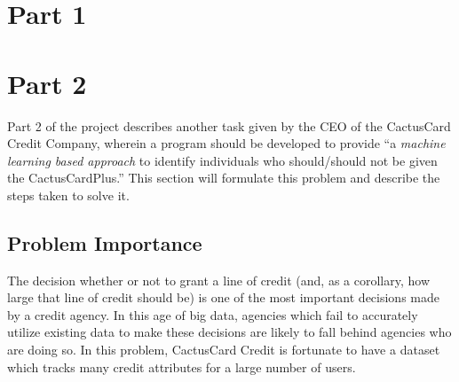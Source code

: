 \documentclass[11pt,journal]{IEEEtran}
\begin{document}
\IEEEpeerreviewmaketitle

\section{Part 1} \label{part1}
\section{Part 2} \label{part2}
Part 2 of the project describes another task given by the CEO of the CactusCard Credit Company, wherein a program should be developed to provide ``a \emph{machine learning based approach} to identify individuals who should/should not be given the CactusCardPlus.'' This section will formulate this problem and describe the steps taken to solve it.

\subsection{Problem Importance}
The decision whether or not to grant a line of credit (and, as a corollary, how large that line of credit should be) is one of the most important decisions made by a credit agency. In this age of big data, agencies which fail to accurately utilize existing data to make these decisions are likely to fall behind agencies who are doing so. In this problem, CactusCard Credit is fortunate to have a dataset which tracks many credit attributes for a large number of users.
\end{document}
